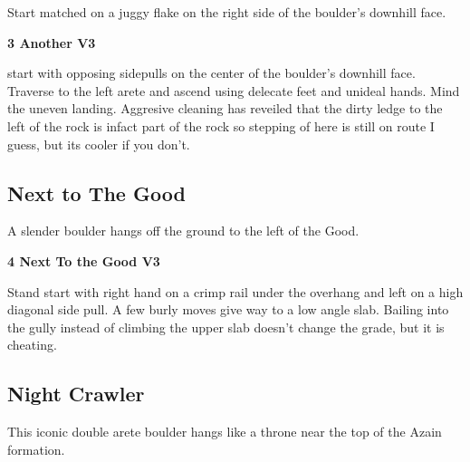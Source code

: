 \begin{multicols}{2}
\begin{minipage}{\linewidth}
					\begin{adjustwidth}{0.5cm}{}				
					Start matched on a juggy flake on the right side of the boulder's downhill face.
					\end{adjustwidth}
					\end{minipage}
					\begin{minipage}{\linewidth}	
					\label{rt:Another}
\colorbox{green!20}{
\parbox{0.95\textwidth}{
\textbf{
3 Another V3   \warn 
}
}
}

					\begin{adjustwidth}{0.5cm}{}				
					start with opposing sidepulls on the center of the boulder's downhill face. Traverse to the left arete and ascend using delecate feet and unideal hands. Mind the uneven landing. Aggresive cleaning has reveiled that the dirty ledge to the left of the rock is infact part of the rock so stepping of here is still on route I guess, but its cooler if you don't.
					\end{adjustwidth}
					\end{minipage}
			\begin{minipage}{\columnwidth}
			\subsection*{Next to The Good}\label{bf:Next to The Good}
			A slender boulder hangs off the ground to the left of the Good.
			
			\end{minipage}
			
					\begin{minipage}{\linewidth}	
					\label{rt:Next To the Good}
\colorbox{green!20}{
\parbox{0.95\textwidth}{
\textbf{
4 Next To the Good V3   \warn 
}
}
}

					\begin{adjustwidth}{0.5cm}{}				
					Stand start with right hand on a crimp rail under the overhang and left on a high diagonal side pull. A few burly moves give way to a low angle slab. Bailing into the gully instead of climbing the upper slab doesn't change the grade, but it is cheating.
					\end{adjustwidth}
					\end{minipage}
			\begin{minipage}{\columnwidth}
			\subsection*{Night Crawler}\label{bf:Night Crawler}
			This iconic double arete boulder hangs like a throne near the top of the Azain formation.
			

\end{minipage}
\end{multicols}
